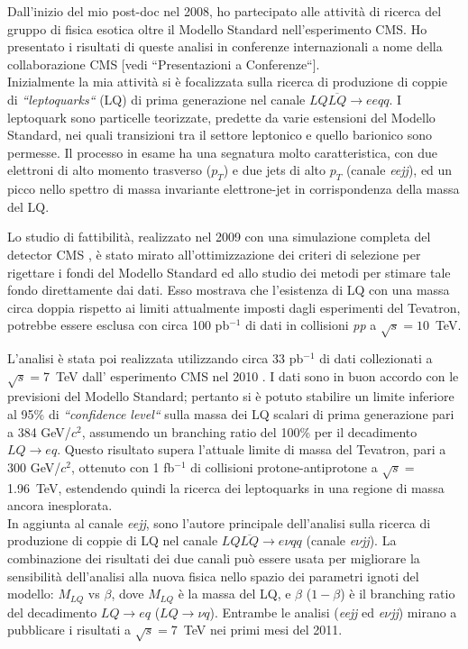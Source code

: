 \documentclass[10pt, a4paper]{article}
\begin{document}
Dall'inizio del mio post-doc nel 2008, ho partecipato alle attivit\`a di ricerca del gruppo di fisica esotica oltre il 
Modello Standard nell'esperimento CMS. Ho presentato i risultati di queste analisi in conferenze internazionali  
a nome della collaborazione CMS [vedi ``Presentazioni a Conferenze``]. \\

Inizialmente la mia attivit\`a si \`e focalizzata sulla ricerca 
di produzione di coppie di {\it ``leptoquarks``} (LQ) di prima generazione nel canale $LQ\overline{LQ} \rightarrow ee qq$. 
I leptoquark sono particelle teorizzate, predette da varie estensioni del Modello Standard, nei quali transizioni tra il settore leptonico 
e quello barionico sono permesse. Il processo in esame ha una segnatura molto caratteristica, con due elettroni di alto momento 
trasverso ($p_T$) e due jets di alto $p_T$ (canale {\it eejj}), ed un picco nello spettro di massa invariante elettrone-jet in corrispondenza 
della massa del LQ. 

Lo studio di fattibilit\`a, realizzato nel 2009 con una simulazione completa del detector CMS \cite{EXO-08-010,AN-2008-070}, 
\`e stato mirato all'ottimizzazione dei criteri di selezione per rigettare i fondi del Modello Standard ed allo studio dei metodi per stimare tale 
fondo direttamente dai dati. Esso mostrava che l'esistenza di LQ con una massa circa doppia rispetto ai limiti attualmente imposti dagli esperimenti 
del Tevatron, potrebbe essere esclusa con circa 100 pb$^{-1}$ di dati in collisioni {\it pp} a $\sqrt{s}=10$~TeV. 

L'analisi \`e stata poi realizzata utilizzando circa 33 pb$^{-1}$ di dati collezionati a $\sqrt{s}=$7~TeV dall' esperimento CMS nel 2010 
\cite{Khachatryan:2010mp,EXO-10-005,AN-2010-230}. 
I dati sono in buon accordo con le previsioni del Modello Standard; pertanto si \`e potuto stabilire un limite inferiore al 95\% di {\it ``confidence level``} 
sulla massa dei LQ scalari di prima generazione pari a 384 GeV/$c^2$, assumendo un branching ratio del 100\% per il decadimento $LQ\rightarrow eq$. 
Questo risultato supera l'attuale limite di massa del Tevatron, pari a 300 GeV/$c^2$, ottenuto con 1 fb$^{-1}$ di collisioni 
protone-antiprotone a $\sqrt{s}=$1.96~TeV, estendendo quindi la ricerca dei leptoquarks in una regione di massa ancora inesplorata. \\

In aggiunta al canale {\it eejj}, sono l'autore principale dell'analisi sulla ricerca di produzione di coppie di LQ nel canale 
$LQ\overline{LQ} \rightarrow e\nu qq$ \cite{AN-2010-361} (canale {\it e$\nu$jj}).
La combinazione dei risultati dei due canali pu\`o essere usata per migliorare la 
sensibilit\`a dell'analisi alla nuova fisica nello spazio dei parametri ignoti del modello: $M_{LQ}$ vs $\beta$, 
dove $M_{LQ}$  \`e la massa del LQ, e $\beta$ ($1-\beta$) \`e il branching ratio del decadimento $LQ\rightarrow eq$ 
($LQ\rightarrow \nu q$). Entrambe le analisi ({\it eejj} ed {\it e$\nu$jj}) mirano a pubblicare i risultati a $\sqrt{s}=$7~TeV nei primi 
mesi del 2011.
\end{document}
